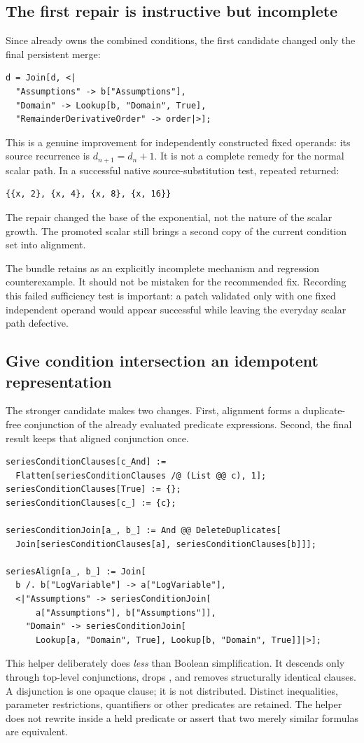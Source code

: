 \documentclass[11pt,a4paper]{article}
\newcommand{\code}[1]{\texttt{\detokenize{#1}}}
\begin{document}
\subsection{The first repair is instructive but incomplete}
Since \code{b} already owns the combined conditions, the first candidate changed only the final persistent merge:
\begin{lstlisting}
d = Join[d, <|
  "Assumptions" -> b["Assumptions"],
  "Domain" -> Lookup[b, "Domain", True],
  "RemainderDerivativeOrder" -> order|>];
\end{lstlisting}
This is a genuine improvement for independently constructed fixed operands: its source recurrence is $d_{n+1}=d_n+1$. It is not a complete remedy for the normal scalar path. In a successful native source-substitution test, repeated \code{SeriesAdd[s,0]} returned:
\begin{lstlisting}
{{x, 2}, {x, 4}, {x, 8}, {x, 16}}
\end{lstlisting}
The repair changed the base of the exponential, not the nature of the scalar growth. The promoted scalar still brings a second copy of the current condition set into alignment.

The bundle retains  as an explicitly incomplete mechanism and regression counterexample. It should not be mistaken for the recommended fix. Recording this failed sufficiency test is important: a patch validated only with one fixed independent operand would appear successful while leaving the everyday scalar path defective.

\subsection{Give condition intersection an idempotent representation}
The stronger candidate makes two changes. First, alignment forms a duplicate-free conjunction of the already evaluated predicate expressions. Second, the final result keeps that aligned conjunction once.
\begin{lstlisting}
seriesConditionClauses[c_And] :=
  Flatten[seriesConditionClauses /@ (List @@ c), 1];
seriesConditionClauses[True] := {};
seriesConditionClauses[c_] := {c};

seriesConditionJoin[a_, b_] := And @@ DeleteDuplicates[
  Join[seriesConditionClauses[a], seriesConditionClauses[b]]];

seriesAlign[a_, b_] := Join[
  b /. b["LogVariable"] -> a["LogVariable"],
  <|"Assumptions" -> seriesConditionJoin[
      a["Assumptions"], b["Assumptions"]],
    "Domain" -> seriesConditionJoin[
      Lookup[a, "Domain", True], Lookup[b, "Domain", True]]|>];
\end{lstlisting}
This helper deliberately does \emph{less} than Boolean simplification. It descends only through top-level conjunctions, drops \code{True}, and removes structurally identical clauses. A disjunction is one opaque clause; it is not distributed. Distinct inequalities, parameter restrictions, quantifiers or other predicates are retained. The helper does not rewrite inside a held predicate or assert that two merely similar formulas are equivalent.
\end{document}
